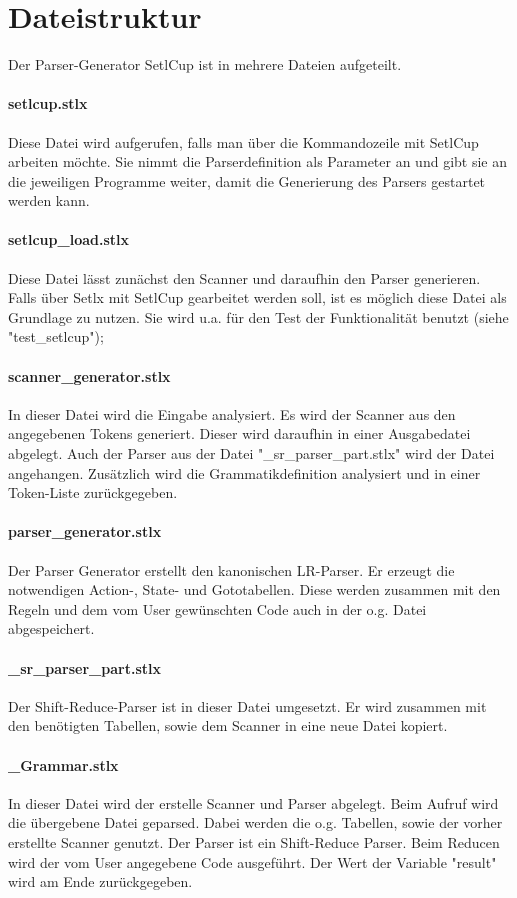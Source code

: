 \section{Dateistruktur}
Der Parser-Generator SetlCup ist in mehrere Dateien aufgeteilt.
\paragraph{setlcup.stlx} Diese Datei wird aufgerufen, falls man über die Kommandozeile mit SetlCup arbeiten möchte. Sie nimmt die Parserdefinition als Parameter an und gibt sie an die jeweiligen Programme weiter, damit die Generierung des Parsers gestartet werden kann.
\paragraph{setlcup\_load.stlx} Diese Datei lässt zunächst den Scanner und daraufhin den Parser generieren. Falls über Setlx mit SetlCup gearbeitet werden soll, ist es möglich diese Datei als Grundlage zu nutzen. Sie wird u.a. für den Test der Funktionalität benutzt (siehe "test\_setlcup");
\paragraph{scanner\_generator.stlx} In dieser Datei wird die Eingabe analysiert. Es wird der Scanner aus den angegebenen Tokens generiert. Dieser wird daraufhin in einer Ausgabedatei abgelegt. Auch der Parser aus der Datei "\_sr\_parser\_part.stlx" wird der Datei angehangen. Zusätzlich wird die Grammatikdefinition analysiert und  in einer Token-Liste zurückgegeben.
\paragraph{parser\_generator.stlx} Der Parser Generator erstellt den kanonischen LR-Parser. Er erzeugt die notwendigen Action-, State- und Gototabellen. Diese werden zusammen mit den Regeln und dem vom User gewünschten Code auch in der o.g. Datei abgespeichert. 
\paragraph{\_sr\_parser\_part.stlx} Der Shift-Reduce-Parser ist in dieser Datei umgesetzt. Er wird zusammen mit den benötigten Tabellen, sowie dem Scanner in eine neue Datei kopiert. 
\paragraph{\_Grammar.stlx} In dieser Datei wird der erstelle Scanner und Parser abgelegt. Beim Aufruf wird die übergebene Datei geparsed. Dabei werden die o.g. Tabellen, sowie der vorher erstellte Scanner genutzt. Der Parser ist ein Shift-Reduce Parser. Beim Reducen wird der vom User angegebene Code ausgeführt. Der Wert der Variable "result" wird am Ende zurückgegeben.

